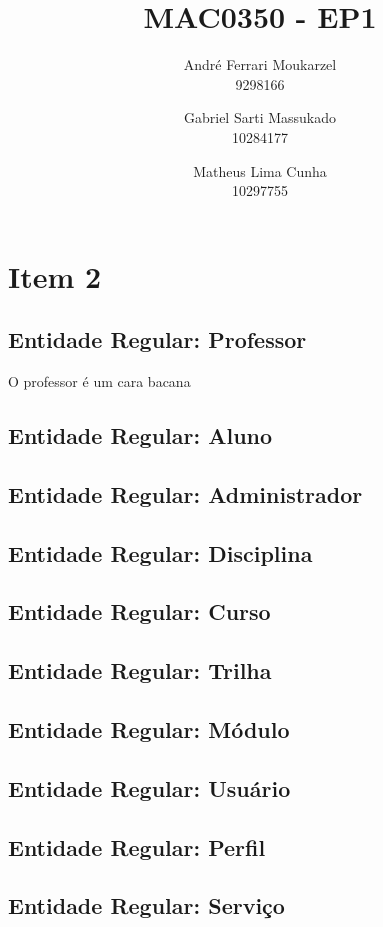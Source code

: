 \documentclass{article}
\title{MAC0350 - EP1}
\date{}
\author{
	André Ferrari Moukarzel \\ 9298166
	\and 
	Gabriel Sarti Massukado \\ 10284177
	\and
	Matheus Lima Cunha \\ 10297755
}
\begin{document}
  \maketitle
  \newpage
  
  \section{Item 2}
  	\subsection{Entidade Regular: Professor}
  		\quad O professor é um cara bacana
  	\subsection{Entidade Regular: Aluno}
  	\subsection{Entidade Regular: Administrador}
  	\subsection{Entidade Regular: Disciplina}
  	\subsection{Entidade Regular: Curso}
  	\subsection{Entidade Regular: Trilha}
  	\subsection{Entidade Regular: M\'odulo}
  	\subsection{Entidade Regular: Usu\'ario}
  	\subsection{Entidade Regular: Perfil}
  	\subsection{Entidade Regular: Servi\c{c}o}
\end{document}
